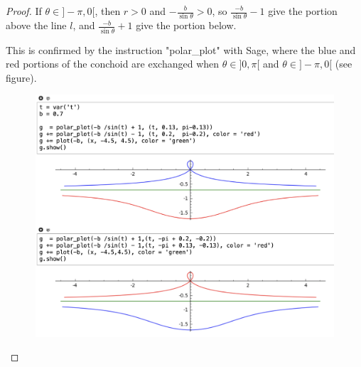 \documentclass[11pt,a4paper]{article}
\begin{document}
\begin{proof}
If  $\theta \in ]-\pi,0[$, then $r>0$ and  $ -\frac{b}{\sin \theta}  > 0$, so $\frac{-b}{\sin \theta} - 1$ give the portion above the line $l$, and  $\frac{-b}{\sin \theta} + 1$ give the portion below.  

This is confirmed by the instruction "polar\_plot" with Sage, where the blue and red portions of the conchoid are exchanged when  $\theta \in ]0,\pi[$ and $\theta \in ]-\pi,0[$ (see figure).
 
\begin{figure}[htbp]
\begin{center}
\includegraphics[width=12cm,height=9cm]{conchoid.png}
\end{center}
\end{figure}

\end{proof}
\end{document}
